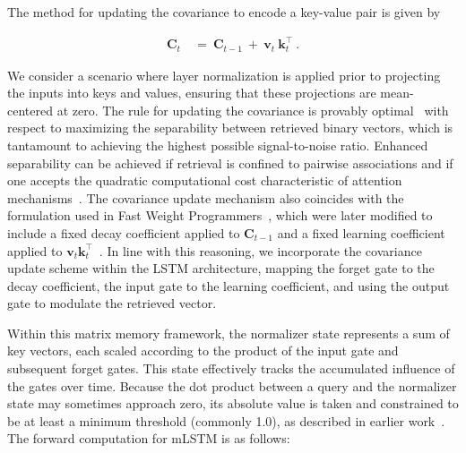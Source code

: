 The method for updating the covariance to encode a key-value pair is given by~\citep{Sejnowski:77,Dayan:91}

\begin{align}
\mathbf{C}_t \ &= \ \mathbf{C}_{t-1} \ + \ \mathbf{v}_{t} \ \mathbf{k}_t^\top \ .
\end{align}

We consider a scenario where layer normalization is applied prior to projecting the inputs into keys and values, ensuring that these projections are mean-centered at zero. The rule for updating the covariance is provably optimal~\citep{Dayan:91} with respect to maximizing the separability between retrieved binary vectors, which is tantamount to achieving the highest possible signal-to-noise ratio. Enhanced separability can be achieved if retrieval is confined to pairwise associations and if one accepts the quadratic computational cost characteristic of attention mechanisms~\citep{Krotov:16,Krotov:17,Ramsauer:21}. The covariance update mechanism also coincides with the formulation used in Fast Weight Programmers~\citep{Schmidhuber:92ncfastweights,Schlag:21}, which were later modified to include a fixed decay coefficient applied to $\mathbf{C}_{t-1}$ and a fixed learning coefficient applied to $\mathbf{v}_{t} \mathbf{k}_t ^\top$~\citep{Ba:16}. In line with this reasoning, we incorporate the covariance update scheme within the LSTM architecture, mapping the forget gate to the decay coefficient, the input gate to the learning coefficient, and using the output gate to modulate the retrieved vector.

Within this matrix memory framework, the normalizer state represents a sum of key vectors, each scaled according to the product of the input gate and subsequent forget gates. This state effectively tracks the accumulated influence of the gates over time. Because the dot product between a query and the normalizer state may sometimes approach zero, its absolute value is taken and constrained to be at least a minimum threshold (commonly 1.0), as described in earlier work~\citep{Sun:23arxiv}. The forward computation for mLSTM is as follows:

